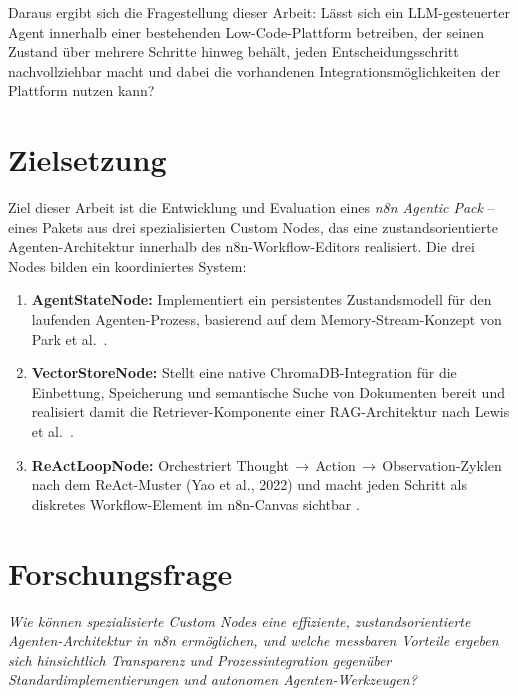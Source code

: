 \documentclass[12pt,a4paper,oneside]{report}
\begin{document}
Daraus ergibt sich die Fragestellung dieser Arbeit: Lässt sich ein LLM-gesteuerter
Agent innerhalb einer bestehenden Low-Code-Plattform betreiben, der seinen Zustand
über mehrere Schritte hinweg behält, jeden Entscheidungsschritt nachvollziehbar macht
und dabei die vorhandenen Integrationsmöglichkeiten der Plattform nutzen kann?

\section{Zielsetzung}

Ziel dieser Arbeit ist die Entwicklung und Evaluation eines \textit{n8n Agentic Pack}
-- eines Pakets aus drei spezialisierten Custom Nodes, das eine zustandsorientierte
Agenten-Architektur innerhalb des n8n-Workflow-Editors realisiert. Die drei Nodes
bilden ein koordiniertes System:

\begin{enumerate}
  \item \textbf{AgentStateNode:} Implementiert ein persistentes Zustandsmodell für
    den laufenden Agenten-Prozess, basierend auf dem Memory-Stream-Konzept von Park
    et al.\ \cite{park2023generative}.

  \item \textbf{VectorStoreNode:} Stellt eine native ChromaDB-Integration für die
    Einbettung, Speicherung und semantische Suche von Dokumenten bereit und realisiert
    damit die Retriever-Komponente einer \ac{RAG}-Architektur nach Lewis et al.\
    \cite{lewis2020retrieval}.

  \item \textbf{ReActLoopNode:} Orchestriert Thought\,$\to$\,Action\,$\to$\,Observation-Zyklen
    nach dem ReAct-Muster (Yao et al., 2022) und macht jeden Schritt als diskretes
    Workflow-Element im n8n-Canvas sichtbar \cite{yao2022react}.
\end{enumerate}

\section{Forschungsfrage}

\begin{displayquote}
\textit{Wie können spezialisierte Custom Nodes eine effiziente, zustandsorientierte
Agenten-Architektur in n8n ermöglichen, und welche messbaren Vorteile ergeben sich
hinsichtlich Transparenz und Prozessintegration gegenüber Standardimplementierungen
und autonomen Agenten-Werkzeugen?}
\end{displayquote}
\end{document}
